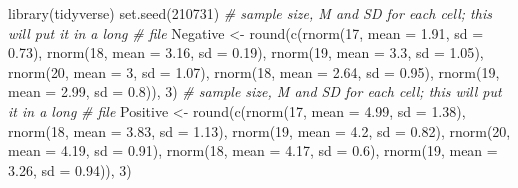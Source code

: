 \documentclass[
  11pt,
]{book}
\newenvironment{Shaded}{\begin{snugshade}}{\end{snugshade}}
\newcommand{\AttributeTok}[1]{\textcolor[rgb]{0.77,0.63,0.00}{#1}}
\newcommand{\CommentTok}[1]{\textcolor[rgb]{0.56,0.35,0.01}{\textit{#1}}}
\newcommand{\DecValTok}[1]{\textcolor[rgb]{0.00,0.00,0.81}{#1}}
\newcommand{\FloatTok}[1]{\textcolor[rgb]{0.00,0.00,0.81}{#1}}
\newcommand{\FunctionTok}[1]{\textcolor[rgb]{0.00,0.00,0.00}{#1}}
\newcommand{\NormalTok}[1]{#1}
\newcommand{\OtherTok}[1]{\textcolor[rgb]{0.56,0.35,0.01}{#1}}
\begin{document}
\begin{Shaded}
\begin{Highlighting}[]
\FunctionTok{library}\NormalTok{(tidyverse)}
\FunctionTok{set.seed}\NormalTok{(}\DecValTok{210731}\NormalTok{)}
\CommentTok{\# sample size, M and SD for each cell; this will put it in a long}
\CommentTok{\# file}
\NormalTok{Negative }\OtherTok{\textless{}{-}} \FunctionTok{round}\NormalTok{(}\FunctionTok{c}\NormalTok{(}\FunctionTok{rnorm}\NormalTok{(}\DecValTok{17}\NormalTok{, }\AttributeTok{mean =} \FloatTok{1.91}\NormalTok{, }\AttributeTok{sd =} \FloatTok{0.73}\NormalTok{), }\FunctionTok{rnorm}\NormalTok{(}\DecValTok{18}\NormalTok{, }\AttributeTok{mean =} \FloatTok{3.16}\NormalTok{,}
    \AttributeTok{sd =} \FloatTok{0.19}\NormalTok{), }\FunctionTok{rnorm}\NormalTok{(}\DecValTok{19}\NormalTok{, }\AttributeTok{mean =} \FloatTok{3.3}\NormalTok{, }\AttributeTok{sd =} \FloatTok{1.05}\NormalTok{), }\FunctionTok{rnorm}\NormalTok{(}\DecValTok{20}\NormalTok{, }\AttributeTok{mean =} \DecValTok{3}\NormalTok{, }\AttributeTok{sd =} \FloatTok{1.07}\NormalTok{),}
    \FunctionTok{rnorm}\NormalTok{(}\DecValTok{18}\NormalTok{, }\AttributeTok{mean =} \FloatTok{2.64}\NormalTok{, }\AttributeTok{sd =} \FloatTok{0.95}\NormalTok{), }\FunctionTok{rnorm}\NormalTok{(}\DecValTok{19}\NormalTok{, }\AttributeTok{mean =} \FloatTok{2.99}\NormalTok{, }\AttributeTok{sd =} \FloatTok{0.8}\NormalTok{)),}
    \DecValTok{3}\NormalTok{)}
\CommentTok{\# sample size, M and SD for each cell; this will put it in a long}
\CommentTok{\# file}
\NormalTok{Positive }\OtherTok{\textless{}{-}} \FunctionTok{round}\NormalTok{(}\FunctionTok{c}\NormalTok{(}\FunctionTok{rnorm}\NormalTok{(}\DecValTok{17}\NormalTok{, }\AttributeTok{mean =} \FloatTok{4.99}\NormalTok{, }\AttributeTok{sd =} \FloatTok{1.38}\NormalTok{), }\FunctionTok{rnorm}\NormalTok{(}\DecValTok{18}\NormalTok{, }\AttributeTok{mean =} \FloatTok{3.83}\NormalTok{,}
    \AttributeTok{sd =} \FloatTok{1.13}\NormalTok{), }\FunctionTok{rnorm}\NormalTok{(}\DecValTok{19}\NormalTok{, }\AttributeTok{mean =} \FloatTok{4.2}\NormalTok{, }\AttributeTok{sd =} \FloatTok{0.82}\NormalTok{), }\FunctionTok{rnorm}\NormalTok{(}\DecValTok{20}\NormalTok{, }\AttributeTok{mean =} \FloatTok{4.19}\NormalTok{,}
    \AttributeTok{sd =} \FloatTok{0.91}\NormalTok{), }\FunctionTok{rnorm}\NormalTok{(}\DecValTok{18}\NormalTok{, }\AttributeTok{mean =} \FloatTok{4.17}\NormalTok{, }\AttributeTok{sd =} \FloatTok{0.6}\NormalTok{), }\FunctionTok{rnorm}\NormalTok{(}\DecValTok{19}\NormalTok{, }\AttributeTok{mean =} \FloatTok{3.26}\NormalTok{,}
    \AttributeTok{sd =} \FloatTok{0.94}\NormalTok{)), }\DecValTok{3}\NormalTok{)}

\end{Highlighting}
\end{Shaded}
\end{document}
